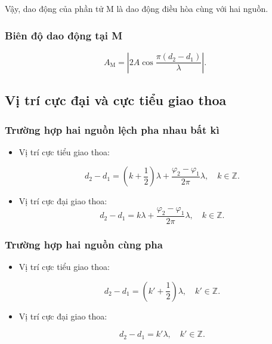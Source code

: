 Vậy, dao động của phần tử M là dao động điều hòa cùng  với hai nguồn.

\subsubsection{Biên độ dao động tại M}
\begin{equation*}
	A_{\text{M}}=\left|2A\cos\dfrac{\pi(d_2-d_1)}{\lambda}\right|.
\end{equation*}
\subsection{Vị trí cực đại và cực tiểu giao thoa}
\subsubsection{Trường hợp hai nguồn lệch pha nhau bất kì}
\begin{itemize}
	\item Vị trí cực tiểu giao thoa:
	
	\begin{equation*}
		d_2-d_1 = \left(k+ \dfrac{1}{2}\right) \lambda + \dfrac{\varphi_2 - \varphi_1}{2\pi} \lambda,\quad k \in \mathbb{Z}.
	\end{equation*}
	\item Vị trí cực đại giao thoa:
	\begin{equation*}
		d_2-d_1 = k\lambda + \dfrac{\varphi_2 - \varphi_1}{2\pi} \lambda,\quad k \in \mathbb{Z}.
	\end{equation*}
\end{itemize}
\subsubsection{Trường hợp hai nguồn cùng pha}
\begin{itemize}
	\item Vị trí cực tiểu giao thoa:
	
	\begin{equation*}
		d_2-d_1 = \left(k'+ \dfrac{1}{2}\right) \lambda,\quad k' \in \mathbb{Z}.
	\end{equation*}
	
	\item Vị trí cực đại giao thoa:
	
	\begin{equation*}
		d_2-d_1 = k'\lambda,\quad k' \in \mathbb{Z}.
	\end{equation*}
\end{itemize}	
